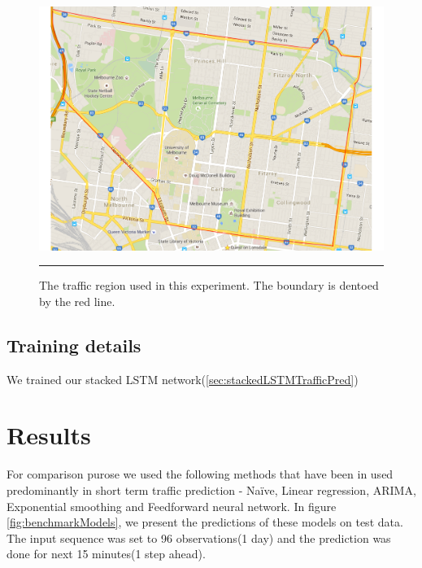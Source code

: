 \begin{figure}[htbp]
  \centering
    \includegraphics[width=\textwidth,height=\textheight,keepaspectratio]{Figures/experiment-region.pdf}
    \rule{35em}{0.5pt}
  \caption[Experiment traffic region]{The traffic region used in this experiment. The boundary is
   dentoed by the red line.}
  \label{fig:ExperimentRegion}
\end{figure}

\subsection{Training details}
We trained our stacked LSTM network(\ref{sec:stackedLSTMTrafficPred})

\section{Results}

For comparison purose we used the following methods that have been in used predominantly in short
term traffic prediction - Naïve, Linear regression, ARIMA, Exponential smoothing and Feedforward
neural network. In figure \ref{fig:benchmarkModels}, we present the predictions of these models
on test data. The input sequence was set to 96 observations(1 day) and the prediction was done for
next 15 minutes(1 step ahead).



